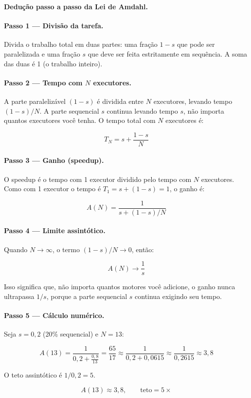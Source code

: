 \begin{metodo}
\textbf{Dedução passo a passo da Lei de Amdahl.}

\paragraph{Passo 1 — Divisão da tarefa.}
Divida o trabalho total em duas partes: uma fração $1-s$ que pode ser paralelizada e uma fração $s$ que deve ser feita estritamente em sequência. A soma das duas é 1 (o trabalho inteiro).

\paragraph{Passo 2 — Tempo com $N$ executores.}
A parte paralelizável $(1-s)$ é dividida entre $N$ executores, levando tempo $(1-s)/N$. A parte sequencial $s$ continua levando tempo $s$, não importa quantos executores você tenha. O tempo total com $N$ executores é:

\[
T_N = s + \frac{1-s}{N}
\]

\paragraph{Passo 3 — Ganho (speedup).}
O speedup é o tempo com 1 executor dividido pelo tempo com $N$ executores. Como com 1 executor o tempo é $T_1 = s + (1-s) = 1$, o ganho é:

\[
\boxed{A(N) = \frac{1}{s + (1-s)/N}}
\]

\paragraph{Passo 4 — Limite assintótico.}
Quando $N \to \infty$, o termo $(1-s)/N \to 0$, então:

\[
A(N) \to \frac{1}{s}
\]

Isso significa que, não importa quantos motores você adicione, o ganho nunca ultrapassa $1/s$, porque a parte sequencial $s$ continua exigindo seu tempo.

\paragraph{Passo 5 — Cálculo numérico.}
Seja $s = 0{,}2$ (20\% sequencial) e $N = 13$:

\[
A(13) = \frac{1}{0{,}2 + \frac{0{,}8}{13}} = \frac{65}{17} \approx \frac{1}{0{,}2 + 0{,}0615} \approx \frac{1}{0{,}2615} \approx 3{,}8
\]

O teto assintótico é $1/0{,}2 = 5$.

\[
\boxed{A(13) \approx 3{,}8, \qquad \text{teto} = 5\times}
\]

\end{metodo}

